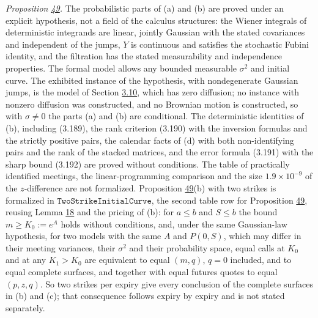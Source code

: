 \documentclass[11pt]{article}
\begin{document}
\emph{Proposition \hyperref[res:Proposition-49]{49}.} The probabilistic parts of (a) and (b) are proved under an explicit hypothesis, not a field of the calculus structures: the Wiener integrals of deterministic integrands are linear, jointly Gaussian with the stated covariances and independent of the jumps, \(Y\) is continuous and satisfies the stochastic Fubini identity, and the filtration has the stated measurability and independence properties. The formal model allows any bounded measurable \(\sigma^2\) and initial curve. The exhibited instance of the hypothesis, with nondegenerate Gaussian jumps, is the model of Section \hyperref[sec:3.10]{3.10}, which has zero diffusion; no instance with nonzero diffusion was constructed, and no Brownian motion is constructed, so with \(\sigma\neq0\) the parts (a) and (b) are conditional. The deterministic identities of (b), including (3.189), the rank criterion (3.190) with the inversion formulas and the strictly positive pairs, the calendar facts of (d) with both non-identifying pairs and the rank of the stacked matrices, and the error formula (3.191) with the sharp bound (3.192) are proved without conditions. The table of practically identified meetings, the linear-programming comparison and the size \(1.9\times10^{-9}\) of the \(z\)-difference are not formalized. Proposition \hyperref[res:Proposition-49]{49}(b) with two strikes is formalized in \(\texttt{TwoStrikeInitialCurve}\), the second table row for Proposition \hyperref[res:Proposition-49]{49}, reusing Lemma \hyperref[res:Lemma-18]{18} and the pricing of (b): for \(a\le b\) and \(S\le b\) the bound \(m\ge K_0:=e^{A}\) holds without conditions, and, under the same Gaussian-law hypothesis, for two models with the same \(A\) and \(P(0,S)\), which may differ in their meeting variances, their \(\sigma^2\) and their probability space, equal calls at \(K_0\) and at any \(K_1>K_0\) are equivalent to equal \((m,q)\), \(q=0\) included, and to equal complete surfaces, and together with equal futures quotes to equal \((p,z,q)\). So two strikes per expiry give every conclusion of the complete surfaces in (b) and (c); that consequence follows expiry by expiry and is not stated separately.
\end{document}
